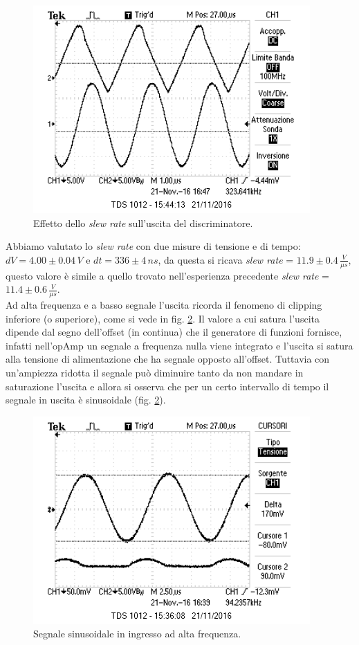 \documentclass[10pt,a4paper]{article}
\begin{document}
\begin{figure}[htb!]
\centering
\includegraphics[scale=1.0]{immagini/slewRate.png}
\caption{Effetto dello \emph{slew rate} sull'uscita del discriminatore.}
\label{slewRate}
\end{figure}

Abbiamo valutato lo \emph{slew rate} con due misure di tensione e di tempo: $dV = 4.00 \pm 0.04 \, V$ e $dt = 336 \pm 4 \, ns$, da questa si ricava \emph{slew rate} = $11.9 \pm 0.4 \, \frac{V}{\mu s}$, questo valore è simile a quello trovato nell'esperienza precedente \emph{slew rate} = $11.4 \pm 0.6 \, \frac{V}{\mu s}$.\\

Ad alta frequenza e a basso segnale l'uscita ricorda il fenomeno di clipping inferiore (o superiore), come si vede in fig. \ref{clipping}. Il valore a cui satura l'uscita dipende dal segno dell'offset (in continua) che il generatore di funzioni fornisce, infatti nell'opAmp un segnale a frequenza nulla viene integrato e l'uscita si satura alla tensione di alimentazione che ha segnale opposto all'offset. Tuttavia con un'ampiezza ridotta il segnale può diminuire tanto da non mandare in saturazione l'uscita e allora si osserva che per un certo intervallo di tempo il segnale in uscita è sinusoidale (fig. \ref{clipping}).\\

\begin{figure}[htb!]
\centering
\includegraphics[scale=1.0]{immagini/prodottoBandaGuadagno2.png}
\caption{Segnale sinusoidale in ingresso ad alta frequenza.}
\label{clipping}
\end{figure}
\end{document}
